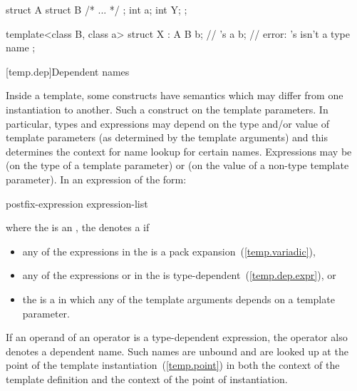 \begin{codeblock}
struct A {
  struct B { /* ... */ };
  int a;
  int Y;
};

template<class B, class a> struct X : A {
  B b;              // 's 
  a b;              // error: 's  isn't a type name
};
\end{codeblock}
\exitexample

[temp.dep]{Dependent names}

\pnum
{}%
Inside a template, some constructs have semantics which may differ from one
instantiation to another.
Such a construct
on the template parameters.
In particular, types and expressions may depend on the type
and/or
value of
template parameters (as determined by the template arguments) and this determines
the context for name lookup for certain names.
Expressions may be
(on the type of a template parameter) or
(on the value of a non-type template parameter).
In an expression of the form:

\begin{ncbnftab}
postfix-expression \terminal{(} expression-list\opt \terminal{)}
\end{ncbnftab}

where the
is an
,
the
denotes a
%
if

\begin{itemize}
\item 
any of the expressions in the  is a pack
expansion~(\ref{temp.variadic}),

\item
any of the expressions
or 
in the
is type-dependent~(\ref{temp.dep.expr}), or

\item
the 
is a  in which any of the template arguments depends
on a template parameter.
\end{itemize}

If an operand of an operator is a type-dependent expression, the operator
also denotes a dependent name.
Such names are unbound and
are looked up at the point of the template instantiation~(\ref{temp.point}) in
both the context of the template definition and the
context of the point of instantiation.

